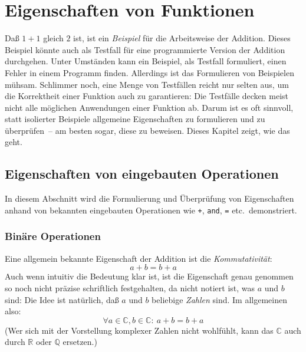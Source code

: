 
\chapter{Eigenschaften von Funktionen}
\label{cha:properties}

Daß $1+1$ gleich $2$ ist, ist ein \textit{Beispiel} für die
Arbeitsweise der Addition.  Dieses Beispiel könnte auch als Testfall
für eine programmierte Version der Addition durchgehen.  Unter
Umständen kann ein Beispiel, als Testfall formuliert, einen Fehler in
einem Programm finden.  Allerdings ist das Formulieren von Beispielen
mühsam.  Schlimmer noch, eine Menge von Testfällen reicht nur selten
aus, um die Korrektheit einer Funktion auch zu garantieren: Die
Testfälle decken meist nicht alle möglichen Anwendungen einer Funktion
ab.  Darum ist es oft sinnvoll, statt isolierter Beispiele allgemeine
Eigenschaften zu formulieren und zu überprüfen~-- am besten sogar,
diese zu beweisen.  Dieses Kapitel zeigt, wie das geht.

\section{Eigenschaften von eingebauten Operationen}

In diesem Abschnitt wird die Formulierung und Überprüfung von
Eigenschaften anhand von bekannten eingebauten Operationen wie
\texttt{+}, \texttt{and}, \texttt{=} etc.\ demonstriert.

\subsection{Binäre Operationen}
\label{sec:eigenschaften-binaere-operationen}

Eine allgemein bekannte Eigenschaft der Addition ist die
\textit{Kommutativität}:
%
\begin{displaymath}
a + b = b + a
\end{displaymath}
%
Auch wenn intuitiv die Bedeutung klar ist, ist  die Eigenschaft genau
genommen so noch nicht präzise schriftlich festgehalten, da nicht
notiert ist, was $a$ und $b$ sind: Die Idee ist natürlich,
daß $a$ und $b$ beliebige \emph{Zahlen} sind.  Im allgemeinen also:
%
\begin{displaymath}
\forall a \in \mathbb{C}, b \in \mathbb{C}:\ a + b = b + a 
\end{displaymath}
%
(Wer sich mit der Vorstellung komplexer Zahlen nicht wohlfühlt, kann
das $\mathbb{C}$ auch durch $\mathbb{R}$ oder $\mathbb{Q}$ ersetzen.)

